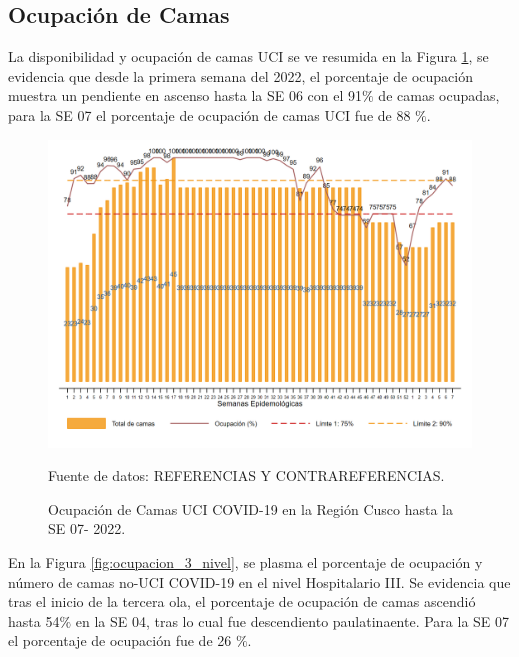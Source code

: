 \documentclass[12pt,a4paper,openany]{book}
\begin{document}
\clearpage
\subsection*{Ocupación de Camas}
\noindent La disponibilidad y ocupación de camas UCI se ve resumida en la Figura \ref{fig:ocupacion_uci}, se evidencia que desde la primera semana del 2022, el porcentaje de ocupación muestra un pendiente en ascenso hasta la SE 06 con el 91$\%$ de camas ocupadas, para la SE 07 el porcentaje de ocupación de camas UCI fue de 88 $\%$. 

\begin{figure}[h]
	\caption{Ocupación de Camas UCI COVID-19 en la Región Cusco hasta la SE 07- 2022.}\label{fig:ocupacion_uci}
	\begin{center}
		\includegraphics[width=0.95\linewidth]{../figuras/uci.png}
	\end{center}
	{\footnotesize {Fuente de datos: REFERENCIAS Y CONTRAREFERENCIAS.}}
\end{figure}
\cleardoublepage

En la Figura \ref{fig:ocupacion_3_nivel}, se plasma el porcentaje de ocupación y número de camas no-UCI COVID-19 en el nivel Hospitalario III. Se evidencia que tras el inicio de la tercera ola, el porcentaje de ocupación de camas ascendió hasta 54$\%$ en la SE 04, tras lo cual fue descendiento paulatinaente. Para la SE 07 el porcentaje de ocupación fue de 26 $\%$.    
  
\end{document}
